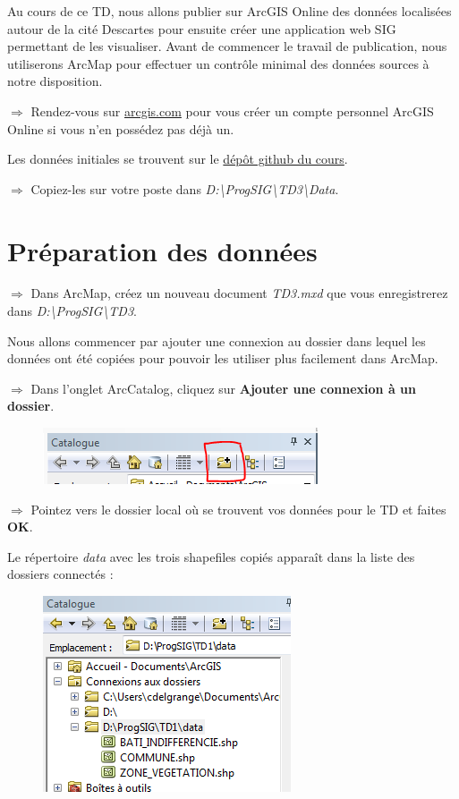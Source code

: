 \documentclass[11pt]{article}
\newcommand{\action}{$\Rightarrow$ }
\begin{document}
Au cours de ce TD, nous allons publier sur ArcGIS Online des données localisées autour de la cité Descartes pour ensuite créer une application web SIG permettant de les visualiser.
Avant de commencer le travail de publication, nous utiliserons ArcMap pour effectuer un contrôle minimal des données sources à notre disposition.

\action Rendez-vous sur \url{arcgis.com} pour vous créer un compte personnel ArcGIS Online si vous n'en possédez pas déjà un.

Les données initiales se trouvent sur le \href{https://github.com/ClementDelgrange/Cours_programmation_SIG/tree/master/data}{dépôt github du cours}.

\action Copiez-les sur votre poste dans \textit{D:\textbackslash{}ProgSIG\textbackslash{}TD3\textbackslash{}Data}.



\section{Préparation des données}

\action Dans ArcMap, créez un nouveau document \textit{TD3.mxd} que vous enregistrerez dans \textit{D:\textbackslash{}ProgSIG\textbackslash{}TD3}.

Nous allons commencer par ajouter une connexion au dossier dans lequel les données ont été copiées pour pouvoir les utiliser plus facilement dans ArcMap.

\action Dans l'onglet ArcCatalog, cliquez sur \textbf{Ajouter une connexion à un dossier}.
\begin{figure}[H]
	\center \includegraphics{img/cours3/am_ajouter_connexion_dossier.png}
\end{figure}

\action Pointez vers le dossier local où se trouvent vos données pour le TD et faites \textbf{OK}.

Le répertoire \textit{data} avec les trois shapefiles copiés apparaît dans la liste des dossiers connectés :
\begin{figure}[H]
	\center \includegraphics{img/cours3/am_ajouter_connexion_dossier_ok.png}
\end{figure}
\end{document}
